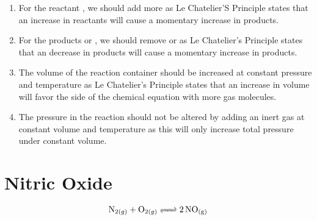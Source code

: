 \documentclass{article}
\begin{document}
\begin{enumerate}
    \item For the reactant , we should add more 
        as Le Chatelier'S Principle states that an increase in reactants will
        cause a momentary increase in products. 
    
    \item For the products  or , we should remove
         or  as Le Chatelier's Principle states that an
        decrease in products will cause a momentary increase in products.
    
    \item The volume of the reaction container should be increased at constant
        pressure and temperature as Le Chatelier's Principle states that an
        increase in volume will favor the side of the chemical equation with
        more gas molecules.
    
    \item The pressure in the reaction should not be altered by adding an inert
        gas at constant volume and temperature as this will only increase total
        pressure under constant volume.
\end{enumerate}

\section{Nitric Oxide}
$$\ce{N_{2(g)} + O_{2(g)} <=> 2NO_{(g)}}$$
\end{document}
